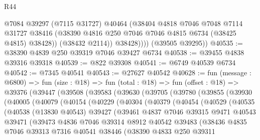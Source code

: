 \begin{lexlean}{R44}
\begin{coremodule}
{                @7084
                @39297
                (@7115 @31727)
                @40464
                (@38404
                  @4818
                  @7046
                  @7048
                  @7114
                  @31727
                  @38416
                  (@38390 @4816 @250 @7046 @7046 @4815 @6734 (@38425 @4815) @38428))
                (@38432 @2114))
              @38428))))
      (@39505 @39295))
@40535 := @38390 @4839 @250 @39319 @7046 @39427 @6734
@40538 := @39455 @4838 @39316 @39318
@40539 := @822 @39308
@40541 := @6749 @40539 @6734
@40542 := @7345 @40541
@40543 := @27627 @40542
@40628 := fun (message : @6800) =>
  fun (size : @18) =>
  fun (total : @18) =>
  fun (offset : @18) =>
  @39376
    (@39447
      (@39508
        (@39583
          (@39630
            (@39705
              (@39780
                (@39855
                  (@39930
                    (@40005
                      (@40079
                        (@40154
                          (@40229
                            (@40304
                              (@40379
                                (@40454
                                  (@40529
                                    (@40535
                                      (@40538
                                        (@13830 @40543)
                                        @39427
                                        (@39461
                                          @4837
                                          @7046
                                          @39315
                                          @9471
                                          @40543
                                          @39471
                                          (@39473
                                            @4836
                                            @7046
                                            @39314
                                            @8912
                                            @40542
                                            @39483
                                            (@38436
                                              @4835
                                              @7046
                                              @39313
                                              @7316
                                              @40541
                                              @38446
                                              (@38390
                                                @4833
                                                @250
                                                @39311
}
\end{coremodule}
\end{lexlean}
